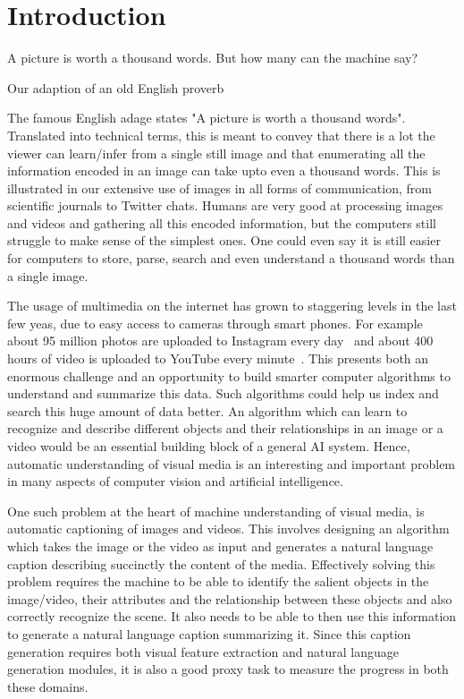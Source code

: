 \chapter{Introduction}
\label{chapter:intro}
\setlength{\epigraphwidth}{\textwidth}
\epigraph{A picture is worth a thousand words. But how many can the machine
say?}{Our adaption of an old English proverb}

The famous English adage states "A picture is worth a thousand
words".
Translated into technical terms, this is meant to convey that there is a lot the
viewer can learn/infer from a single still image and that enumerating all the
information encoded in an image can take upto even a thousand words.
This is illustrated in our extensive use of images in all forms of
communication, from scientific journals to Twitter chats. 
%
Humans are very good at processing images and videos and gathering all this
encoded information, but the computers still struggle to make sense of the
simplest ones.
%
One could even say it is still easier for computers to store, parse, search and
even understand a thousand words than a single image.
%

The usage of multimedia on the internet has grown to staggering levels in the
last few yeas, due to easy access to cameras through smart phones.
For example about 95 million photos are uploaded to Instagram every
day~\cite{InstStats} and about 400 hours of video is uploaded to YouTube every
minute~\cite{YouStats}.
This presents both an enormous challenge and an opportunity to build smarter
computer algorithms to understand and summarize this data.
Such algorithms could help us index and search this huge amount of data better.
An algorithm which can learn to recognize and describe different objects and
their relationships in an image or a video would be an essential building block
of a general AI system.
Hence, automatic understanding of visual media is an interesting and important
problem in many aspects of computer vision and artificial intelligence.
%

One such problem at the heart of machine understanding of visual media, is
automatic captioning of images and videos.
This involves designing an algorithm which takes the image or the video as input
and generates a natural language caption describing succinctly the content of
the media.
Effectively solving this problem requires the machine to be able to identify the
salient objects in the image/video, their attributes and the relationship
between these objects and also correctly recognize the scene.
It also needs to be able to then use this information to generate a natural language
caption summarizing it.
Since this caption generation requires both visual feature extraction and natural
language generation modules, it is also a good proxy task to measure the
progress in both these domains. 


